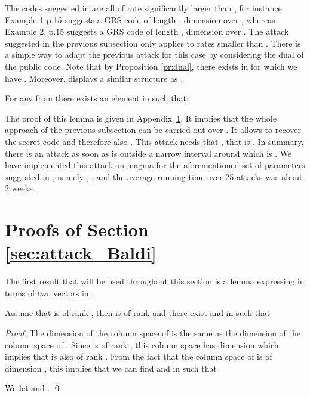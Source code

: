 \documentclass[runningheads,11pt]{llncs}
\begin{document}
The codes suggested in \cite[\S5.1.1,\S5.1.2]{BBCRS11a} are all of rate significantly larger than ,
for instance Example 1 p.15 suggests a GRS code of length , dimension  over , 
whereas Example 2. p.15 suggests a GRS code of length , dimension  over .
The attack suggested in the previous subsection only applies to rates smaller than .
There is a simple way to adapt the previous attack for this case by
considering the dual   of the public code. Note that by
Proposition \ref{pr:dual},  there exists  in  for which
we have . Moreover,
 displays a similar structure as .
\begin{lemma}\label{lem:structure_dual}
For any  from  there exists an element  in  such that:

\end{lemma}



The proof of this lemma is given in Appendix~\ref{appendixBaldi}. It implies that the whole approach of the previous subsection can be 
carried out over . It allows to recover the secret code  and therefore also . This attack needs
that , that is . In summary, there is an attack as soon as  is outside a narrow interval around
 which is  . We have implemented
this attack on magma for the aforementioned set of parameters suggested
in \cite{BBCRS11a}, namely , ,  
and the average running time over 25 attacks was about 2 weeks.






\newpage




\newpage
\appendix
  
\newpage 

 \section{Proofs of Section \ref{sec:attack_Baldi}} \label{appendixBaldi}
 
 The first result that will be used throughout this section is a lemma expressing
  in terms of two vectors in :
 \begin{lemma}
 \label{lem:RPi-1}
 Assume that  is of rank , then  is of rank  and there exist  and  in  such that
 
 \end{lemma}
 \begin{proof}
 The dimension of the column space of  is the same as the dimension of the column space of
 . Since  is of rank , this column space has dimension  which implies
 that  is also of rank . From the fact that the column space of  is of dimension , this implies 
 that we can find  and  in  such that 
 
 We let  and .
 \qed
 \end{proof}
 
\end{document}

